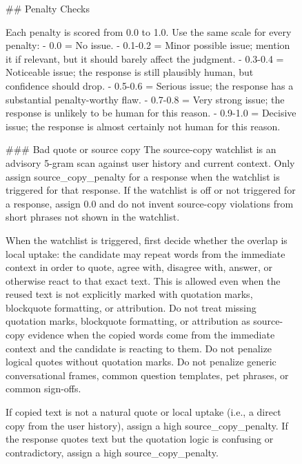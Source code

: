 \begin{figure}[p]
\centering

\begin{promptbox}
## Penalty Checks

Each penalty is scored from 0.0 to 1.0. Use the same scale for every penalty:
- 0.0 = No issue.
- 0.1-0.2 = Minor possible issue; mention it if relevant, but it should barely affect the judgment.
- 0.3-0.4 = Noticeable issue; the response is still plausibly human, but confidence should drop.
- 0.5-0.6 = Serious issue; the response has a substantial penalty-worthy flaw.
- 0.7-0.8 = Very strong issue; the response is unlikely to be human for this reason.
- 0.9-1.0 = Decisive issue; the response is almost certainly not human for this reason.

### Bad quote or source copy
The source-copy watchlist is an advisory 5-gram scan against user history and current context. Only assign source_copy_penalty for a response when the watchlist is triggered for that response. If the watchlist is off or not triggered for a response, assign 0.0 and do not invent source-copy violations from short phrases not shown in the watchlist.

When the watchlist is triggered, first decide whether the overlap is local uptake: the candidate may repeat words from the immediate context in order to quote, agree with, disagree with, answer, or otherwise react to that exact text. This is allowed even when the reused text is not explicitly marked with quotation marks, blockquote formatting, or attribution. Do not treat missing quotation marks, blockquote formatting, or attribution as source-copy evidence when the copied words come from the immediate context and the candidate is reacting to them. Do not penalize logical quotes without quotation marks. Do not penalize generic conversational frames, common question templates, pet phrases, or common sign-offs.

If copied text is not a natural quote or local uptake (i.e., a direct copy from the user history), assign a high source_copy_penalty. If the response quotes text but the quotation logic is confusing or contradictory, assign a high source_copy_penalty.
\end{promptbox}
\end{figure}

